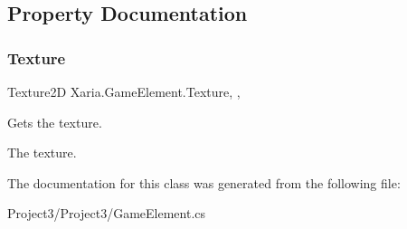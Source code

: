 \subsection{Property Documentation}
\mbox{\label{classXaria_1_1GameElement_ae5816c3fd6f76aa7af85b1cc9c8a5cf8}} 
\subsubsection{\texorpdfstring{Texture}{Texture}}
{\footnotesize\ttfamily Texture2D Xaria.\+Game\+Element.\+Texture\hspace{0.3cm}{\ttfamily [get]}, {\ttfamily [set]}, {\ttfamily [protected]}}



Gets the texture. 

The texture. 

The documentation for this class was generated from the following file\+:\begin{DoxyCompactItemize}
\item 
Project3/\+Project3/Game\+Element.\+cs\end{DoxyCompactItemize}

